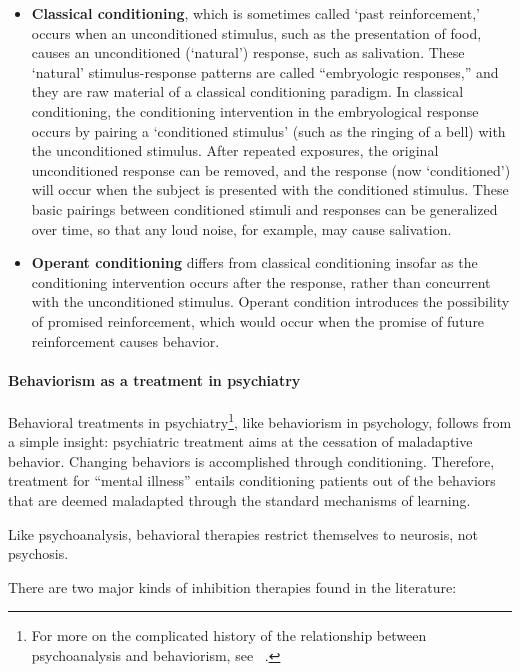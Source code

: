 \begin{refsection}
\begin{itemize}
\item \textbf{Classical conditioning}, which is sometimes called `past reinforcement,' occurs when an unconditioned stimulus, such as the presentation of food, causes an unconditioned (`natural') response, such as salivation. These `natural' stimulus-response patterns are called “embryologic responses,” and they are raw material of a classical conditioning paradigm. In classical conditioning, the conditioning intervention in the embryological response occurs by pairing a `conditioned stimulus' (such as the ringing of a bell) with the unconditioned stimulus. After repeated exposures, the original unconditioned response can be removed, and the response (now `conditioned') will occur when the subject is presented with the conditioned stimulus. These basic pairings between conditioned stimuli and responses can be generalized over time, so that any loud noise, for example, may cause salivation. 

\item \textbf{Operant conditioning} differs from classical conditioning insofar as the conditioning intervention occurs after the response, rather than concurrent with the unconditioned stimulus. Operant condition introduces the possibility of promised reinforcement, which would occur when the promise of future reinforcement causes behavior.

\end{itemize}

\paragraph{Behaviorism as a treatment in psychiatry}
\label{behaviorismasatreatmentinpsychiatry}

Behavioral treatments in psychiatry\footnote{For more on the complicated history of the relationship between psychoanalysis and behaviorism, see ~\citep{Hornstein:2002wq}.}, like behaviorism in psychology, follows from a simple insight: psychiatric treatment aims at the cessation of maladaptive behavior. Changing behaviors is accomplished through conditioning. Therefore, treatment for “mental illness” entails conditioning patients out of the behaviors that are deemed maladapted through the standard mechanisms of learning. 

Like psychoanalysis, behavioral therapies restrict themselves to neurosis, not psychosis.

There are two major kinds of inhibition therapies found in the literature:


\end{refsection}
